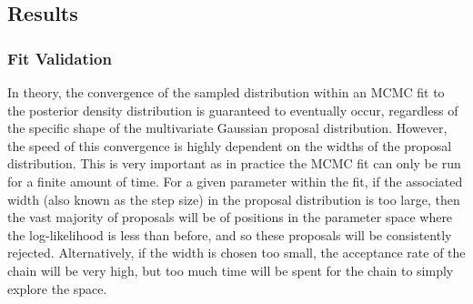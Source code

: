 
\subsection{Results}
\subsubsection{Fit Validation}
In theory, the convergence of the sampled distribution within an MCMC fit to the posterior density distribution is guaranteed to eventually occur, regardless of the specific shape of the multivariate Gaussian proposal distribution. However, the speed of this convergence is highly dependent on the widths of the proposal distribution. This is very important as in practice the MCMC fit can only be run for a finite amount of time. For a given parameter within the fit, if the associated width (also known as the step size) in the proposal distribution is too large, then the vast majority of proposals will be of positions in the parameter space where the log-likelihood is less than before, and so these proposals will be consistently rejected. Alternatively,  if the width is chosen too small, the acceptance rate of the chain will be very high, but too much time will be spent for the chain to simply explore the space.

